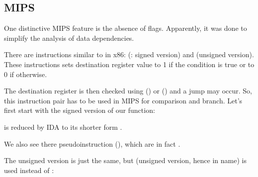 ﻿\subsection{MIPS}

One distinctive MIPS feature is the absence of flags.
Apparently, it was done to simplify the analysis of data dependencies.


There are instructions similar to  in x86:  (: signed version) and 
 (unsigned version).
These instructions sets destination register value to 1 if the condition is true or to 0 if otherwise.


The destination register is then checked using  () or  () 
and a jump may occur.
So, this instruction pair has to be used in MIPS for comparison and branch.
Let's first start with the signed version of our function:



 is reduced by IDA to its 
shorter form .

We also see there  pseudoinstruction (), 
which are in fact .


The unsigned version is just the same, but  (unsigned version, hence  in name) is used instead of :



